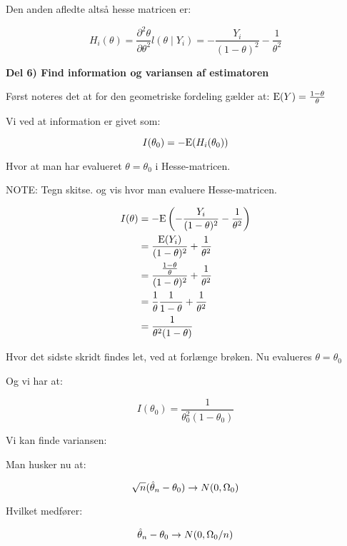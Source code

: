 Den anden afledte altså hesse matricen er:

\begin{equation}
    H_i (\theta) = \frac{\partial^2 \theta}{\partial \theta^2}  l (\theta \mid Y_i) = -\frac{Y_i}{(1-\theta)^2} -\frac{1}{\theta^2}
\end{equation}

\textbf{Del 6) Find information og variansen af estimatoren}

Først noteres det at for den geometriske fordeling gælder at: $\text{E}(Y) = \frac{1 - \theta}{\theta}$

Vi ved at information er givet som:

\begin{equation}
    I(\theta_0) = - \text{E}(H_i(\theta_0))
\end{equation}

Hvor at man har evalueret $\theta= \theta_0$ i Hesse-matricen.

NOTE: Tegn skitse. og vis hvor man evaluere Hesse-matricen.

\begin{align}
   I(\theta) &= - \text{E} \left( -\frac{Y_i}{(1-\theta)^2} -\frac{1}{\theta^2} \right) \\&= \frac{\text{E}(Y_i)}{(1-\theta)^2} + \frac{1}{\theta^2} \\
   &= \frac{\frac{1 - \theta}{\theta}}{(1-\theta)^2} + \frac{1}{\theta^2} \\
   &= \frac{1}{\theta}\frac{1}{1-\theta} + \frac{1}{\theta^2} \\
   &= \frac{1}{\theta^2 (1 - \theta)}
\end{align}

Hvor det sidste skridt findes let, ved at forlænge brøken. Nu evalueres $\theta = \theta_0$

Og vi har at:

\begin{equation}
    I(\theta_0) = \frac{1}{\theta_0^2 (1 - \theta_0)}
\end{equation}

Vi kan finde variansen:

Man husker nu at:

\begin{equation}
    \sqrt{n}(\hat{\theta}_n - \theta_0) \rightarrow N(0, \Omega_0)
\end{equation}

Hvilket medfører:

\begin{equation}
    \hat{\theta}_n - \theta_0 \rightarrow N(0, \Omega_0 / n)
\end{equation}

